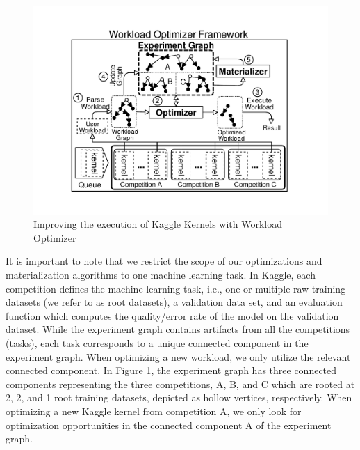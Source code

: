 \begin{figure}
\centering
\includegraphics[width=\columnwidth]{../images/kaggle-workload-optimizer}
\caption{Improving the execution of Kaggle Kernels with Workload Optimizer}
\label{improved-use-case}
\end{figure}

It is important to note that we restrict the scope of our optimizations and materialization algorithms to one machine learning task. 
In Kaggle, each competition defines the machine learning task, i.e., one or multiple raw training datasets (we refer to as root datasets), a validation data set, and an evaluation function which computes the quality/error rate of the model on the validation dataset.
While the experiment graph contains artifacts from all the competitions (tasks), each task corresponds to a unique connected component in the experiment graph.
When optimizing a new workload, we only utilize the relevant connected component.
In Figure \ref{improved-use-case}, the experiment graph has three connected components representing the three competitions, A, B, and C which are rooted at 2, 2, and 1 root training datasets, depicted as hollow vertices, respectively.
When optimizing a new Kaggle kernel from competition A, we only look for optimization opportunities in the connected component A of the experiment graph.